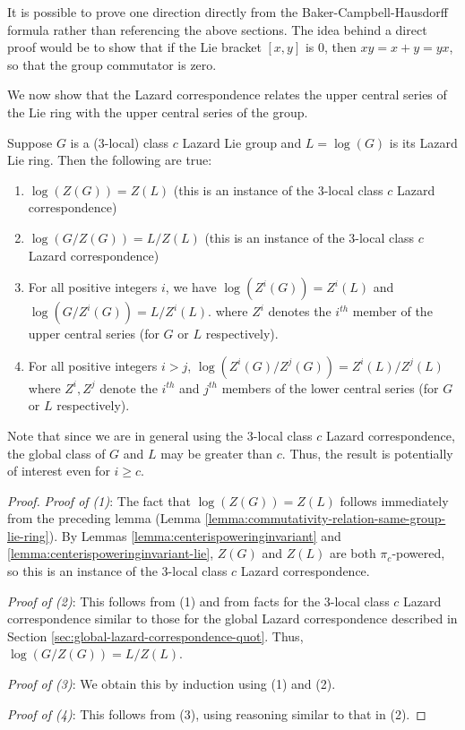 \documentclass{ucetd}
\begin{document}
It is possible to prove one direction directly from the
Baker-Campbell-Hausdorff formula rather than referencing the above
sections. The idea behind a direct proof would be to show that if the
Lie bracket $[x,y]$ is $0$, then $xy = x + y = yx$, so that the group
commutator is zero.

We now show that the Lazard correspondence relates the upper central
series of the Lie ring with the upper central series of the group.

\begin{theorem}
  Suppose $G$ is a ($3$-local) class $c$ Lazard Lie group and $L =
  \log(G)$ is its Lazard Lie ring. Then the following are true:

  \begin{enumerate}
  \item $\log(Z(G)) = Z(L)$ (this is an instance of the $3$-local
    class $c$ Lazard correspondence)
  \item $\log(G/Z(G)) = L/Z(L)$ (this is an instance of the $3$-local
    class $c$ Lazard correspondence)
  \item For all positive integers $i$, we have $\log(Z^i(G)) = Z^i(L)$
    and $\log(G/Z^i(G)) = L/Z^i(L)$.  where $Z^i$ denotes the $i^{th}$
    member of the upper central series (for $G$ or $L$ respectively).
  \item For all positive integers $i > j$, $\log(Z^i(G)/Z^j(G)) =
    Z^i(L)/Z^j(L)$ where $Z^i,Z^j$ denote the $i^{th}$ and $j^{th}$
    members of the lower central series (for $G$ or $L$ respectively).
  \end{enumerate}
\end{theorem}

Note that since we are in general using the $3$-local class $c$ Lazard
correspondence, the global class of $G$ and $L$ may be greater than
$c$. Thus, the result is potentially of interest even for $i \ge c$.

\begin{proof}
  {\em Proof of (1)}: The fact that $\log(Z(G)) = Z(L)$ follows
  immediately from the preceding lemma (Lemma
  \ref{lemma:commutativity-relation-same-group-lie-ring}). By Lemmas
  \ref{lemma:centerispoweringinvariant} and
  \ref{lemma:centerispoweringinvariant-lie}, $Z(G)$ and $Z(L)$ are
  both $\pi_c$-powered, so this is an instance of the $3$-local class
  $c$ Lazard correspondence.

  {\em Proof of (2)}: This follows from (1) and from facts for the
  $3$-local class $c$ Lazard correspondence similar to those for the
  global Lazard correspondence described in Section
  \ref{sec:global-lazard-correspondence-quot}.  Thus, $\log(G/Z(G)) =
  L/Z(L)$.

  {\em Proof of (3)}: We obtain this by induction using (1) and (2).

  {\em Proof of (4)}: This follows from (3), using reasoning similar
  to that in (2).
\end{proof}
\end{document}
